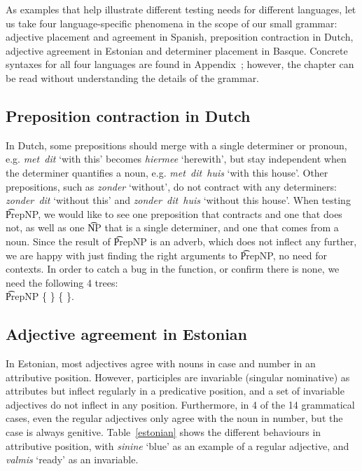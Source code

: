As examples that help illustrate different testing needs for different
languages, let us take four language-specific phenomena in the scope
of our small grammar: adjective placement and agreement in Spanish,
preposition contraction in Dutch, adjective agreement in Estonian and
determiner placement in Basque. Concrete syntaxes for all four
languages are found in Appendix~; however, the
chapter can be read without understanding the details of the grammar.


\subsection{Preposition contraction in Dutch} In Dutch, some prepositions should
merge with a single determiner or pronoun, e.g. \emph{met~dit} `with
this' becomes \emph{hiermee} `herewith', but stay independent when the
determiner quantifies a noun, e.g. \emph{met~dit~huis} `with this house'. 
Other prepositions, such as \emph{zonder} `without', do not
contract with any determiners: \emph{zonder~dit} `without this' and
\emph{zonder~dit~huis} `without this house'.
When testing \t{PrepNP}, we would like to see one preposition that
contracts and one that does not, as well as one \t{NP} that is a
single determiner, and one that comes from a noun. Since the result of
\t{PrepNP} is an adverb, which does not inflect any further, we are
happy with just finding the right arguments to \t{PrepNP}, no need for contexts.
In order to catch a bug in the function, or confirm there is none, we
need the following 4 trees: \\
\t{PrepNP} \{  \} 
           \{  \}. 

\subsection{Adjective agreement in Estonian} In Estonian,
most adjectives agree with nouns in case and number in an attributive
position. However, participles are invariable (singular nominative) as 
attributes but inflect regularly in a predicative position, and a set
of invariable adjectives do not inflect in any position. Furthermore,
in 4 of the 14 grammatical cases, even the regular adjectives only
agree with the noun in number, but the case is always genitive.
Table~\ref{estonian} shows the different behaviours in attributive
position, with \emph{sinine} `blue' as an example of a regular
adjective, and \emph{valmis} `ready' as an invariable.


